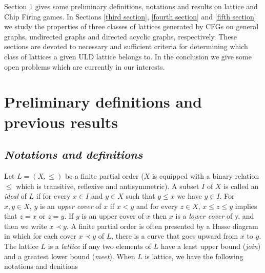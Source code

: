\documentclass{article}
\theoremstyle{definition}
\begin{document}
Section \ref{second section} gives some preliminary definitions, notations and results on lattice and Chip Firing games. In Sections \ref{third section}, \ref{fourth section} and \ref{fifth section} we study the properties of three classes of lattices generated by CFGs on general graphs, undirected graphs and directed acyclic graphs, respectively. These sections are devoted to necessary and sufficient criteria for determining which class of lattices a given ULD lattice belongs to. In the conclusion we give some open problems which are currently in our interests.
\section{Preliminary definitions and previous results}
\label{second section}
\subsection{\small \textit{Notations and definitions}}
\hspace{1.ex}Let $L=(X,\leq)$ be a finite partial order ($X$ is equipped with a binary relation $\leq$ which is transitive, reflexive and antisymmetric). A subset $I$ of $X$ is called an \emph{ideal} of $L$ if for every $x \in I$ and $y \in X$ such that $y \leq x$ we have $y \in I$. For $x,y\in X$, $y$ is an \emph{upper cover} of $x$ if $x<y$ and for every $z\in X$, $x \leq z \leq y$ implies that $z=x$ or $z=y$. If $y$ is an upper cover of $x$ then $x$ is a \emph{lower cover} of y, and then we write $x \prec y$. A finite partial order is often presented by a Hasse diagram in which for each cover $x \prec y$ of $L$, there is a curve that goes upward from $x$ to $y$. The lattice $L$ is a \emph{lattice} if any two elements of $L$ have a least upper bound (\emph{join}) and a greatest lower bound (\emph{meet}). When $L$ is lattice, we have the following notations and denitions
\end{document}
